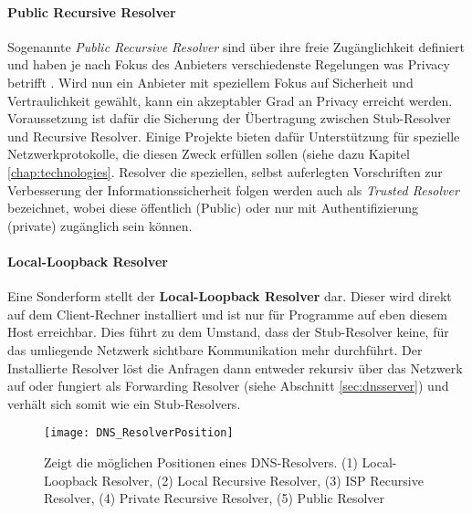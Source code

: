 \paragraph{Public Recursive Resolver}
Sogenannte \textit{Public Recursive Resolver} sind über ihre freie Zugänglichkeit definiert und haben je nach Fokus des Anbieters verschiedenste Regelungen was Privacy betrifft \cite{Prince2018}\cite{Quad92018}. Wird nun ein Anbieter mit speziellem Fokus auf Sicherheit und Vertraulichkeit gewählt, kann ein akzeptabler Grad an Privacy erreicht werden. Voraussetzung ist dafür die Sicherung der Übertragung zwischen Stub-Resolver und Recursive Resolver. Einige Projekte bieten dafür Unterstützung für spezielle Netzwerkprotokolle, die diesen Zweck erfüllen sollen (siehe dazu Kapitel \ref{chap:technologies}. Resolver die speziellen, selbst auferlegten Vorschriften zur Verbesserung der Informationssicherheit folgen werden auch als \textit{Trusted Resolver} bezeichnet, wobei diese öffentlich (Public) oder nur mit Authentifizierung (private) zugänglich sein können.

\paragraph{Local-Loopback Resolver}
Eine Sonderform stellt der \textbf{Local-Loopback Resolver} dar. Dieser wird direkt auf dem Client-Rechner installiert und ist nur für Programme auf eben diesem Host erreichbar. Dies führt zu dem Umstand, dass der Stub-Resolver keine, für das umliegende Netzwerk sichtbare Kommunikation mehr durchführt. Der Installierte Resolver löst die Anfragen dann entweder rekursiv über das Netzwerk auf oder fungiert als Forwarding Resolver (siehe Abschnitt \ref{sec:dnsserver}) und verhält sich somit wie ein Stub-Resolvers.

\begin{figure}[htbp]
    \centering
    \texttt{[image: DNS\_ResolverPosition]}
    \caption{Zeigt die möglichen Positionen eines DNS-Resolvers. (1) Local-Loopback Resolver, (2) Local Recursive Resolver, (3) ISP Recursive Resolver, (4) Private Recursive Resolver, (5) Public Resolver}
    \label{img:dnsresolverposition}
\end{figure}
